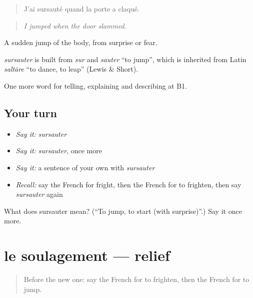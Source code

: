 \begin{quote}
J'ai sursauté quand la porte a claqué.
\end{quote}

\begin{quote}
\emph{I jumped when the door slammed.}
\end{quote}

A sudden jump of the body, from surprise or fear.

\begin{cousinweb}
\emph{sursauter} is built from \emph{sur} and \emph{sauter} \textquotedblleft{}to jump\textquotedblright{}, which is inherited from Latin \emph{saltāre} \textquotedblleft{}to dance, to leap\textquotedblright{} (Lewis \& Short).
\end{cousinweb}

\begin{grammarlens}[title={What you've built}]
One more word for telling, explaining and describing at B1.
\end{grammarlens}

\subsection*{Your turn}
\begin{itemize}
\raggedright
  \item \emph{Say it:} \emph{sursauter}
  \item \emph{Say it:} \emph{sursauter}, once more
  \item \emph{Say it:} a sentence of your own with \emph{sursauter}
  \item \emph{Recall:} say the French for fright, then the French for to frighten, then say \emph{sursauter} again
\end{itemize}

\begin{tcolorbox}[breakable,colback=teal!4,colframe=teal!35!black,title={Before you move on}]
What does sursauter mean? (\textquotedblleft{}To jump, to start (with surprise)\textquotedblright{}.) Say it once more.
\end{tcolorbox}
\section[le soulagement]{le soulagement — relief}

\label{lesson:FR-C470-soulagement}



\begin{quote}
Before the new one: say the French for to frighten, then the French for to jump.
\end{quote}


